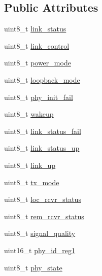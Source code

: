 \subsection*{Public Attributes}
\begin{DoxyCompactItemize}
\item 
uint8\+\_\+t \mbox{\hyperlink{structdiagnostic_data_msg_q_a245d0a07f61d25d2e1ff557b19e70a7d}{link\+\_\+status}}
\item 
uint8\+\_\+t \mbox{\hyperlink{structdiagnostic_data_msg_q_a7e4ef1e3f7dd556bd9e255de7a597157}{link\+\_\+control}}
\item 
uint8\+\_\+t \mbox{\hyperlink{structdiagnostic_data_msg_q_a90060672b628bbc10b2b1ec57bbd70d4}{power\+\_\+mode}}
\item 
uint8\+\_\+t \mbox{\hyperlink{structdiagnostic_data_msg_q_ac850d1259adaa1fedd24a888de52876c}{loopback\+\_\+mode}}
\item 
uint8\+\_\+t \mbox{\hyperlink{structdiagnostic_data_msg_q_a67a92bf1837844081c9116ee8dd9f9b9}{phy\+\_\+init\+\_\+fail}}
\item 
uint8\+\_\+t \mbox{\hyperlink{structdiagnostic_data_msg_q_a8af90f2f6077250420f9c4830906a82f}{wakeup}}
\item 
uint8\+\_\+t \mbox{\hyperlink{structdiagnostic_data_msg_q_ada0ebddb1236e03e2d6d88f1b9258838}{link\+\_\+status\+\_\+fail}}
\item 
uint8\+\_\+t \mbox{\hyperlink{structdiagnostic_data_msg_q_a9c64483015ad9178f27b0123dbf30de8}{link\+\_\+status\+\_\+up}}
\item 
uint8\+\_\+t \mbox{\hyperlink{structdiagnostic_data_msg_q_ae52e94a4412c56455cef23ff03950a84}{link\+\_\+up}}
\item 
uint8\+\_\+t \mbox{\hyperlink{structdiagnostic_data_msg_q_acc9c509a517ee2079aa6ff9de27c61a4}{tx\+\_\+mode}}
\item 
uint8\+\_\+t \mbox{\hyperlink{structdiagnostic_data_msg_q_ae45089c1e314f4e059d58d3a4d5cb3b7}{loc\+\_\+rcvr\+\_\+status}}
\item 
uint8\+\_\+t \mbox{\hyperlink{structdiagnostic_data_msg_q_a9df57b9322c5062e933a4b249464b189}{rem\+\_\+rcvr\+\_\+status}}
\item 
uint8\+\_\+t \mbox{\hyperlink{structdiagnostic_data_msg_q_a388d4481911a1758675d14b3e6307f52}{signal\+\_\+quality}}
\item 
uint16\+\_\+t \mbox{\hyperlink{structdiagnostic_data_msg_q_ad301b21bba0db0dae4edcee06ea102af}{phy\+\_\+id\+\_\+reg1}}
\item 
uint8\+\_\+t \mbox{\hyperlink{structdiagnostic_data_msg_q_a7c689ed948d10149b201b3ec4d54a8bb}{phy\+\_\+state}}

\end{DoxyCompactItemize}
